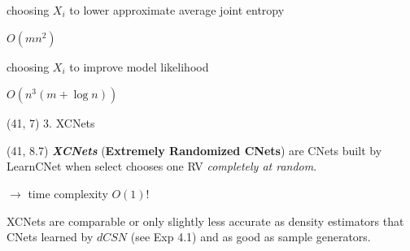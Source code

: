 \documentclass[final]{beamer}
\begin{document}
\begin{frame}{}
\begin{textblock}{17.5}
    \begin{center}
      \begin{minipage}{0.9\linewidth}
        \begin{description}[align=parright]
        \item[\textbf{\textsf{entCNet}}~\cite{Rahman2014}] choosing
          $X_{i}$ to lower approximate average joint entropy\par
          {\hfill $O(mn^2)$}
        \item[\textbf{\textsf{dCSN}}~\cite{DiMauro2015a}] choosing
          $X_{i}$ to improve model likelihood\par
          {\hfill $O(n^3(m + \log n))$}
        \end{description}
      \end{minipage}
    \end{center}
    
  \end{textblock}





  \begin{textblock}{17.5}(41, 7)
    3. XCNets
  \end{textblock}
  \begin{textblock}{17.5}(41, 8.7)
    \small
    \emph{\textbf{XCNets}} (\textbf{Extremely Randomized CNets}) are CNets built by \textsf{LearnCNet} when
    \textsf{select} chooses one RV \emph{completely at random}.\par
    {\hfill$\rightarrow$ time complexity $O(1)$!}
    \vspace{10pt}
    
    XCNets are comparable or only slightly less accurate as density estimators that
    CNets learned by $dCSN$ (see Exp 4.1)
    and as good as sample generators.
    \vspace{10pt}


\end{textblock}
\end{frame}
\end{document}
